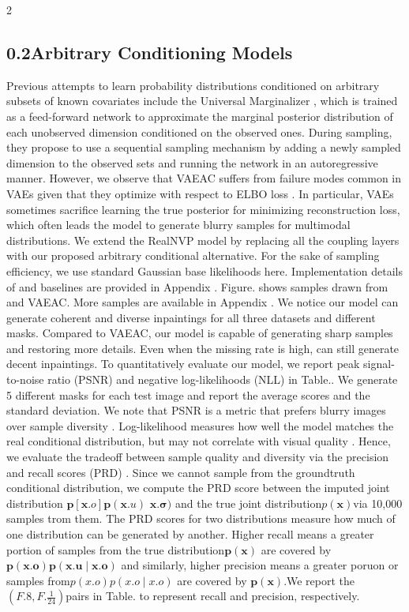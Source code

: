 \documentclass{article}
\begin{document}
\begin{paracol}{2}
\subsection*{0.2Arbitrary Conditioning Models}


Previous attempts to learn probability distributions conditioned on arbitrary subsets of known covariates include the
Universal Marginalizer , which is trained as a feed-forward
network to approximate the marginal posterior distribution
of each unobserved dimension conditioned on the observed
ones. During sampling, they propose to use a sequential
sampling mechanism by adding a newly sampled dimension
to the observed sets and running the network in an autoregressive manner. However, we observe that VAEAC suffers
from failure modes common in VAEs given that they optimize with respect to ELBO loss . In particular, VAEs sometimes sacrifice learning the true posterior for minimizing reconstruction loss, which often leads the model to generate
blurry samples for multimodal distributions. We extend the
RealNVP model by replacing all the coupling layers with
our proposed arbitrary conditional alternative. For the sake
of sampling efficiency, we use standard Gaussian base likelihoods here. Implementation details of and baselines are provided in Appendix . Figure. shows samples drawn from and
VAEAC. More samples are available in Appendix . We notice our model can generate coherent and diverse inpaintings for all three datasets and different masks. Compared
to VAEAC, our model is capable of generating sharp samples and restoring more details. Even when the missing rate
is high, can still generate decent inpaintings. To quantitatively evaluate our model, we report peak signal-to-noise
ratio (PSNR) and negative log-likelihoods (NLL) in Table..
We generate 5 different masks for each test image and report the average scores and the standard deviation. We note
that PSNR is a metric that prefers blurry images over sample diversity . Log-likelihood measures how well the model
matches the real conditional distribution, but may not correlate with visual quality . Hence, we evaluate the tradeoff between sample quality and diversity via the precision
and recall scores (PRD) . Since we cannot sample from the
groundtruth conditional distribution, we compute the PRD
score between the imputed joint distribution ${ \pmb { p } } [ { \pmb { x } } . { o } ] { \pmb { p } } ( { \pmb { x } } . { u } )$
${ \pmb x } . { \pmb { \sigma } } )$ and the true joint distribution$p ( { \pmb x } )$via 10,000 samples
trom them. The PRD scores for two distributions measure
how much of one distribution can be generated by another.
Higher recall means a greater portion of samples from the
true distribution${ \pmb { p } } ( { \pmb { x } } )$ are covered by$\pmb { p } ( \pmb { x . { o } } ) \pmb { p } ( \pmb { x . { u } } \mid \pmb { x . { o } } )$ and
similarly, higher precision means a greater poruon or samples from$p ( x . { o } ) p ( x . { o } \mid x . { o } )$ are covered by ${ \pmb { p } } ( { \pmb { x } } )$.We report
the$( F . { 8 }, F . { \frac { 1 } { 2 4 } } )$pairs in Table. to represent recall and precision,
respectively.

\end{paracol}
\end{document}

